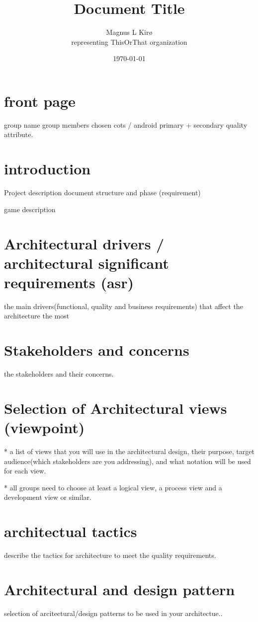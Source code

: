 \documentclass[12pt, a4paper]{article}
\title{Document Title}
\author{
        Magnus L Kirø \\
		representing ThisOrThat organization %
}
\date{\today}
\begin{document}
\maketitle
{}

\section{front page}
group name
group members
chosen cots / android
primary + secondary quality attribute. 

\section{introduction}
Project description
document structure and phase (requirement)

game description

\section{Architectural drivers / architectural significant requirements (asr)}
the main drivers(functional, quality and business requirements) that affect the architecture the most 

\section{Stakeholders and concerns}
the stakeholders and their concerns. 

\section{Selection of Architectural views (viewpoint)}
* a list of views that you will use in the architectural design, their purpose, target audience(which stakeholders are you addressing), and what notation will be used for each view. 

* all groups need  to choose at least a logical view, a process view and a development view or similar. 

\section{architectual tactics}
describe the tactics for architecture to meet the quality requirements. 

\section{Architectural and design pattern}
selection of arcitectural/design patterns to be used in your architectue..
\end{document}
